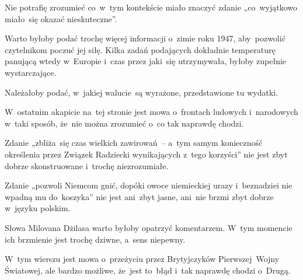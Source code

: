 \documentclass[a4paper,11pt]{article}
\numberwithin{equation}{section}
\begin{document}
\noindent
{} Nie potrafię zrozumieć co~w~tym kontekście miało
znaczyć zdanie „co~wyjątkowo miało~się okazać nieskuteczne”.

\VerSpaceFour





\noindent
{} Warto byłoby podać trochę więcej informacji o~zimie roku 1947,
aby~pozwolić czytelnikom poczuć jej siłę. Kilka zadań podających dokładnie
temperaturę panującą wtedy w~Europie i~czas przez jaki~się utrzymywała,
byłoby zupełnie wystarczające.

\VerSpaceFour





\noindent
{} Należałoby podać, w~jakiej walucie~są wyrażone,
przedstawione tu wydatki.

\VerSpaceFour





\noindent
{} W~ostatnim akapicie na~tej stronie jest mowa o~frontach ludowych
i~narodowych w~taki sposób, że~nie można zrozumieć o~co tak naprawdę chodzi.

\VerSpaceFour





\noindent
{} Zdanie „zbliża~się czas wielkich zawirowań~-- a~tym
samym konieczność określenia przez Związek Radziecki wynikających z~tego
korzyści” nie jest zbyt dobrze skonstruowane i~trochę niezrozumiałe.

\VerSpaceFour





\noindent
{} Zdanie „pozwoli Niemcom gnić, dopóki owoce
niemieckiej urazy i~beznadziei nie wpadną mu do~koszyka” nie jest
ani~zbyt jasne, ani~nie brzmi zbyt dobrze w~języku polskim.

\VerSpaceFour





\noindent
{} Słowa Milovana Dżilasa warto byłoby opatrzyć
komentarzem. W~tym momencie ich brzmienie jest trochę dziwne, a~sens
niepewny.

\VerSpaceFour





\noindent
{} W~tym wierszu jest mowa o~przeżyciu przez
Brytyjczyków Pierwszej~Wojny Światowej, ale bardzo możliwe, że~jest to~błąd
i~tak naprawdę chodzi o~Drugą.
\end{document}
